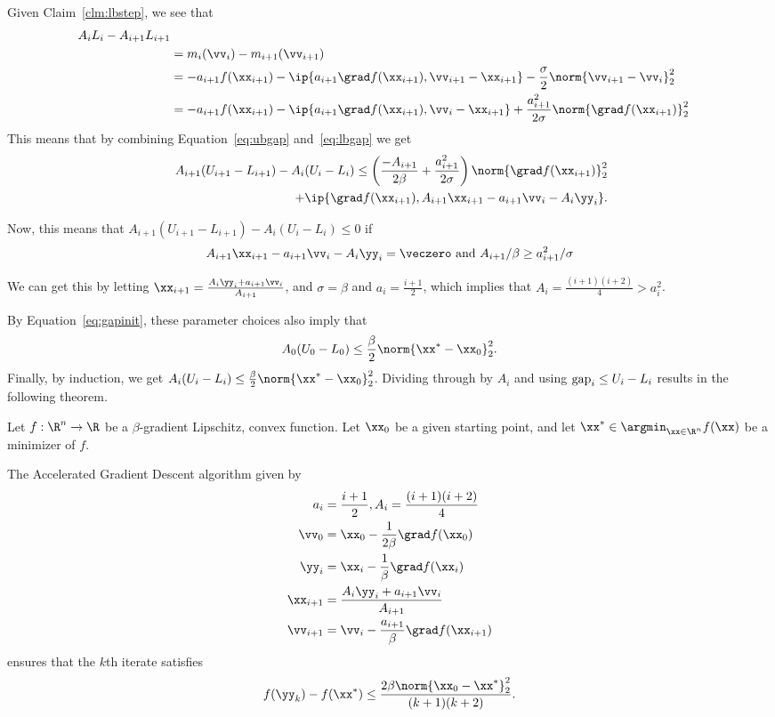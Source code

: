 Given Claim~\ref{clm:lbstep}, we see that
\begin{align}
 \nonumber
A_iL_i-A_{i+1}L_{i+1}
\\
&= m_{i}(\vv_i)  - m_{i+1}(\vv_{i+1})
\\
&=
-  a_{i+1}  f(\xx_{i+1})
-  \ip{ a_{i+1}\grad
 f(\xx_{i+1}) ,\vv_{i+1} - \xx_{i+1}}
-
\frac{\sigma}{2} \norm{ \vv_{i+1} -
  \vv_i}_2^2
\\
&=
-  a_{i+1}  f(\xx_{i+1})
-  \ip{ a_{i+1}\grad f(\xx_{i+1}) ,\vv_{i} - \xx_{i+1}}
+
  \frac{a_{i+1}^2}{2\sigma} \norm{ \grad f(\xx_{i+1})}_2^2
  \label{eq:lbgap}
\end{align}
This means that by combining Equation~\eqref{eq:ubgap}
and~\eqref{eq:lbgap} we get
\begin{align*}
 \
 A_{i+1}( U_{i+1} - L_{i+1})
-
 A_{i}( U_{i} - L_{i})
 \leq
 \left(
 \frac{-A_{i+1}}{2\beta}
 +
\frac{a_{i+1}^2}{2\sigma}
 \right)
 \norm{ \grad f(\xx_{i+1})}_2^2
 \\
 +  \ip{\grad f(\xx_{i+1}) ,
 A_{i+1} \xx_{i+1}
 - a_{i+1} \vv_{i}
 - A_{i} \yy_{i}}
 .
\end{align*}

Now, this means that $ A_{i+1}( U_{i+1} - L_{i+1}) - A_{i}( U_{i} -
L_{i}) \leq 0$ if
\[
  A_{i+1} \xx_{i+1}
 - a_{i+1} \vv_{i}
 - A_{i} \yy_{i} = \veczero
\text{ and }
A_{i+1}/\beta \geq  a_{i+1}^2/\sigma
\]

We can get this by letting
$\xx_{i+1} = \frac{
A_{i} \yy_{i} + a_{i+1} \vv_{i}
}{A_{i+1}}
$, and $\sigma = \beta$ and $a_i = \frac{i+1}{2}$,
which implies that $A_i = \frac{(i+1)(i+2)}{4} > a_i^2$.



By Equation~\eqref{eq:gapinit}, these parameter choices also imply
that
\[
 A_0 (U_0 - L_0) \leq \frac{\beta }{2}\norm{ \xx^* - \xx_0}_2^2  .
\]
Finally, by induction, we get
$ A_{i}( U_{i} - L_{i})  \leq  \frac{\beta }{2}\norm{ \xx^* -
 \xx_0}_2^2$.
Dividing through by $A_i$ and using $\text{gap}_i \leq  U_{i} - L_{i}$
results in the following theorem.
\begin{theorem}
 Let $f : \R^n \to \R$ be a $\beta$-gradient Lipschitz, convex
 function.
 Let $\xx_0$ be a given starting point,
 and let $\xx^* \in \argmin_{\xx \in \R^n} f(\xx)$ be a minimizer of
 $f$.

The Accelerated Gradient Descent algorithm given by
\begin{align*}
 a_i &= \frac{i+1}{2}, A_i = \frac{(i+1)(i+2)}{4}     \\
\vv_0 & = \xx_0 - \frac{1}{2\beta} \grad f(\xx_0) \\
 \yy_{i} &= \xx_{i} - \frac{1}{\beta} \grad f(\xx_{i}) \\
 \xx_{i+1} &=  \frac{
A_{i} \yy_{i} + a_{i+1} \vv_{i}
           }{A_{i+1}} \\
 \vv_{i+1} &= \vv_{i}  - \frac{a_{i+1}}{\beta} \grad f(\xx_{i+1})
\end{align*}
ensures that the $k$th iterate satisfies
\[
  f(\yy_{k}) - f(\xx^*)\leq \frac{2 \beta \norm{\xx_0 - \xx^*}_2^2}{(k+1)(k+2)}
  .
\]
\end{theorem}




%

